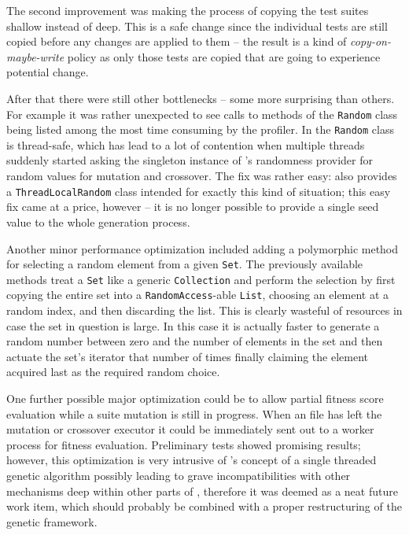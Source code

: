 The second improvement was making the process of copying the test suites shallow instead of deep. 
This is a safe change since the individual tests are still copied before any changes are applied 
to them -- the result is a kind of \emph{copy-on-maybe-write} policy as only those tests are copied 
that are going to experience potential change.

After that there were still other bottlenecks -- some more surprising than others. For example 
it was rather unexpected to see calls to methods of the \texttt{Random} class being listed among the most time
consuming by the profiler. In  the \texttt{Random} class is thread-safe, which has lead to a lot of 
contention when multiple threads suddenly started asking the singleton instance of \evosuite's randomness 
provider for random values for mutation and crossover. The fix was rather easy:  also provides 
a \texttt{ThreadLocalRandom} class intended for exactly this kind of situation; this easy fix came 
at a price, however -- it is no longer possible to provide a single seed value to the whole generation 
process.

Another minor performance optimization included adding a polymorphic method for selecting a random 
element from a given \texttt{Set}. The previously available methods treat a \texttt{Set} like a 
generic \texttt{Collection} and perform the selection by first copying the entire set into a 
\texttt{RandomAccess}-able \texttt{List}, choosing an element at a random index, and then discarding the list.
This is clearly wasteful of resources in case the set in question is large. In this case it is actually faster
to generate a random number between zero and the number of elements in the set and then actuate the set's
iterator that number of times finally claiming the element acquired last as the required random choice.

One further possible major optimization could be to allow partial fitness score evaluation while a suite 
mutation is still in progress. When an \xml file has left the mutation or crossover executor it could be 
immediately sent out to a worker process for fitness evaluation. Preliminary tests showed promising 
results; however, this optimization is very intrusive of \evosuite's concept of a single threaded 
genetic algorithm possibly leading to grave incompatibilities with other mechanisms deep within other parts 
of \evosuite, therefore it was deemed as a neat future work item, which should probably be combined with a 
proper restructuring of the genetic framework.

